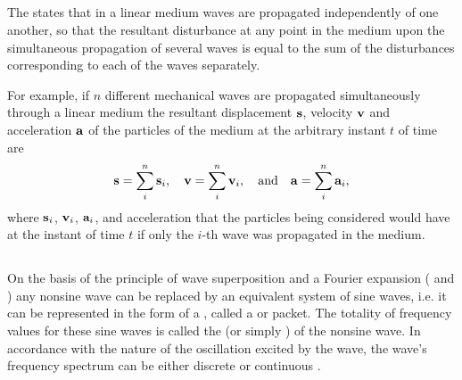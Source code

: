\subsection{}\label{30.4.1} The  states that in a linear medium  waves are propagated independently of one another, so that the resultant disturbance at any point in the medium upon the simultaneous propagation of several waves is equal to the sum of the disturbances corresponding to each of the waves separately.

For example, if $n$ different mechanical waves are propagated simultaneously through a linear medium the resultant displacement $\vb{s}$, velocity $\vb{v}$ and acceleration $\vb{a}$ of the particles of the medium at the arbitrary instant $t$ of time are
\begin{equation*}%
\vb{s} = \sum_{i}^{n} \vb{s}_{i},\quad \vb{v} = \sum_{i}^{n} \vb{v}_{i},\qand \vb{a} = \sum_{i}^{n} \vb{a}_{i},
\end{equation*}
where $\vb{s}_{i}$, $\vb{v}_{i}$, $\vb{a}_{i}$, and acceleration that the particles being considered would have at the instant of time $t$ if only the $i$-th wave was propagated in the medium.

\subsection{}\label{30.4.2} On the basis of the principle of wave superposition and a Fourier expansion ( and ) any nonsine wave can be replaced by an equivalent system of sine waves, i.e. it can be represented in the form of a , called a  or packet. The totality of frequency values for these sine waves is called the  (or simply ) of the nonsine wave. In accordance with the nature of the oscillation excited by the wave, the wave's frequency spectrum can be either discrete  or continuous .

